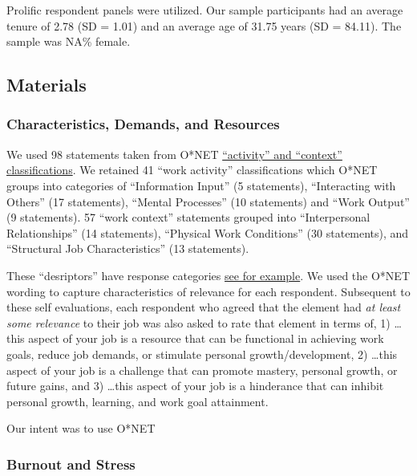 \documentclass[
  english,
  man]{apa6}
\begin{document}
Prolific respondent panels were utilized. Our sample participants had an average tenure of 2.78 (SD = 1.01) and an average age of 31.75 years (SD = 84.11). The sample was NA\% female.

\hypertarget{materials}{%
\subsection{Materials}\label{materials}}

\hypertarget{characteristics-demands-and-resources}{%
\subsubsection{Characteristics, Demands, and Resources}\label{characteristics-demands-and-resources}}

We used 98 statements taken from O*NET \href{https://www.O*NETonline.org/find/descriptor/result/4.A.1.b.3}{``activity'' and ``context'' classifications}. We retained 41 ``work activity'' classifications which O*NET groups into categories of ``Information Input'' (5 statements), ``Interacting with Others'' (17 statements), ``Mental Processes'' (10 statements) and ``Work Output'' (9 statements). 57 ``work context'' statements grouped into ``Interpersonal Relationships'' (14 statements), ``Physical Work Conditions'' (30 statements), and ``Structural Job Characteristics'' (13 statements).

These ``desriptors'' have response categories \href{https://www.O*NETonline.org/find/descriptor/result/4.C.1.c.2}{see for example}. We used the O*NET wording to capture characteristics of relevance for each respondent. Subsequent to these self evaluations, each respondent who agreed that the element had \emph{at least some relevance} to their job was also asked to rate that element in terms of, 1) \ldots this aspect of your job is a resource that can be functional in achieving work goals, reduce job demands, or stimulate personal growth/development, 2) \ldots this aspect of your job is a challenge that can promote mastery, personal growth, or future gains, and 3) \ldots this aspect of your job is a hinderance that can inhibit personal growth, learning, and work goal attainment.

Our intent was to use O*NET

\hypertarget{burnout-and-stress}{%
\subsubsection{Burnout and Stress}\label{burnout-and-stress}}
\end{document}
